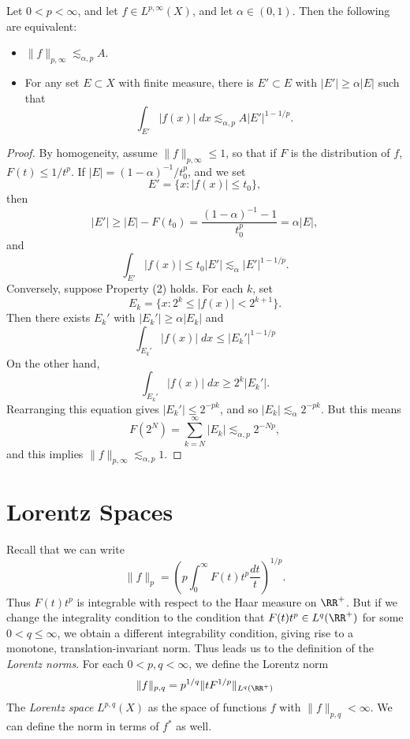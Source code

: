 \begin{theorem} \label{weakdualitytheorem}
  Let $0 < p < \infty$, and let $f \in L^{p,\infty}(X)$, and let $\alpha \in (0,1)$. Then the following are equivalent:
  \begin{itemize}
    \item $\| f \|_{p,\infty} \lesssim_{\alpha,p} A$.

    \item For any set $E \subset X$ with finite measure, there is $E' \subset E$ with $|E'| \geq \alpha |E|$ such that
    \[ \int_{E'} |f(x)|\; dx \lesssim_{\alpha,p} A |E'|^{1 - 1/p}. \]
  \end{itemize}
\end{theorem}
\begin{proof}
  By homogeneity, assume $\| f \|_{p,\infty} \leq 1$, so that if $F$ is the distribution of $f$, $F(t) \leq 1/t^p$. If $|E| = (1-\alpha)^{-1} / t_0^p$, and we set
  \[ E' = \{ x: |f(x)| \leq t_0 \}, \]
  then
  \[ |E'| \geq |E| - F(t_0) = \frac{(1 - \alpha)^{-1} - 1}{t_0^p} = \alpha |E|, \]
  and
  \[ \int_{E'} |f(x)| \leq t_0 |E'| \lesssim_\alpha |E'|^{1-1/p}. \]
  Conversely, suppose Property (2) holds. For each $k$, set
  \[ E_k = \{ x: 2^k \leq |f(x)| < 2^{k+1} \}. \] 
  Then there exists $E_k'$ with $|E_k'| \geq \alpha |E_k|$ and
  \[ \int_{E_k'} |f(x)|\; dx \leq |E_k'|^{1 - 1/p} \]
  On the other hand,
  \[ \int_{E_k'} |f(x)|\; dx \geq 2^k |E_k'|. \]
  Rearranging this equation gives $|E_k'| \leq 2^{-pk}$, and so $|E_k| \lesssim_\alpha 2^{-pk}$. But this means
  \[ F(2^N) = \sum_{k = N}^\infty |E_k| \lesssim_{\alpha,p} 2^{-Np}, \]
  and this implies $\| f \|_{p,\infty} \lesssim_{\alpha,p} 1$.
\end{proof}

\section{Lorentz Spaces}

Recall that we can write
%
\[ \| f \|_p = \left( p \int_0^\infty F(t) t^p \frac{dt}{t} \right)^{1/p}. \]
%
Thus $F(t) t^p$ is integrable with respect to the Haar measure on $\RR^+$. But if we change the integrality condition to the condition that $F(t) t^p \in L^q(\RR^+)$ for some $0 < q \leq \infty$, we obtain a different integrability condition, giving rise to a monotone, translation-invariant norm. Thus leads us to the definition of the \emph{Lorentz norms}. For each $0 < p,q < \infty$, we define the Lorentz norm
%
\[ \| f \|_{p,q} = p^{1/q} \| t F^{1/p} \|_{L^q(\RR^+)} \]
%
The \emph{Lorentz space} $L^{p,q}(X)$ as the space of functions $f$ with $\| f \|_{p,q} < \infty$. We can define the norm in terms of $f^*$ as well.

